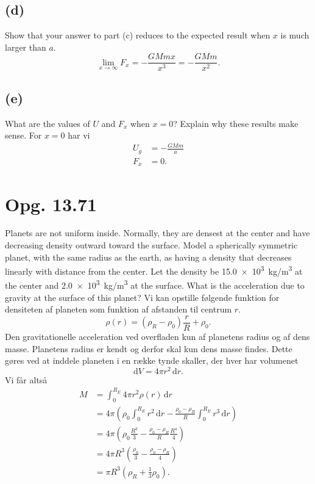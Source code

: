 \documentclass[12pt]{article}
\theoremstyle{definition}
\begin{document}
\subsection*{(d)}
Show that your answer to part (c) reduces to the expected result when $x$ is much larger than $a$.
\bigbreak
\[ 
\lim_{x \to \infty} F_x = - \frac{GMmx}{x^3} = - \frac{GMm}{x^2}
.\]


\subsection*{(e)}
What are the values of $U$ and $F_x$ when $x = 0$? Explain why these results make sense.
\bigbreak
For $x = 0$ har vi
\begin{align*}
  U_g &= - \frac{GMm}{a} \\
  F_x &= 0
.\end{align*}


\section*{Opg. 13.71}
Planets are not uniform inside. Normally, they are densest at the center and have decreasing density outward toward the surface. Model a spherically symmetric planet, with the same radius as the earth, as having a density that decreases linearly with distance from the center. Let the density be \qty{15,0e3}{kg/m^3}  at the center and \qty{2,0e3}{kg/m^3}  at the surface. What is the acceleration due to gravity at the surface of this planet?
\bigbreak
Vi kan opstille følgende funktion for densiteten af planeten som funktion af afstanden til centrum $r$. 
\[ 
\rho(r) = (\rho_R - \rho_0)\frac{r}{R} + \rho_0
.\]
Den gravitationelle acceleration ved overfladen kun af planetens radius og af dens masse. Planetens radius er kendt og derfor skal kun dens masse findes. Dette gøres ved at inddele planeten i en række tynde skaller, der hver har volumenet
\[ 
\mathrm{d}V = 4\pi r^2 \, \mathrm{d}r
.\]
Vi får altså
\begin{align*}
  M &= \int_{0}^{R_E} 4\pi r^2 \rho(r) \, \mathrm{d}r \\
    &= 4\pi \left( \rho_0 \int_{0}^{R_E} r^2 \, \mathrm{d}r - \frac{\rho_0 - \rho_R}{R} \int_{0}^{R_E} r^3 \, \mathrm{d}r \right)  \\
    &= 4\pi \left( \rho_0 \frac{R^3}{3} - \frac{\rho_0 - \rho_R}{R} \frac{R^{4}}{4} \right) \\
    &= 4\pi R^3 \left( \frac{\rho_0}{3} - \frac{\rho_0 - \rho_R}{4} \right) \\
    &= \pi R^3 \left( \rho_R + \frac{1}{3}\rho_0 \right)
.\end{align*}
\end{document}
